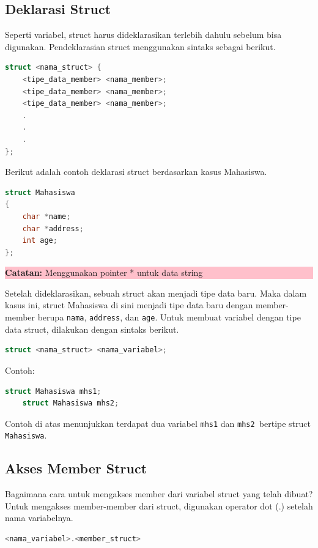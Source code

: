 \subsection{Deklarasi Struct}
Seperti variabel, struct harus dideklarasikan terlebih dahulu sebelum bisa digunakan. Pendeklarasian struct menggunakan sintaks sebagai berikut.

\begin{lstlisting}[language=c]
struct <nama_struct> {
    <tipe_data_member> <nama_member>;
    <tipe_data_member> <nama_member>;
    <tipe_data_member> <nama_member>;
    .
    .
    .
};
\end{lstlisting}

Berikut adalah contoh deklarasi struct berdasarkan kasus Mahasiswa.
\begin{lstlisting}[language=c]
struct Mahasiswa
{
    char *name;
    char *address;
    int age;
};
\end{lstlisting}
\begin{center}
    \colorbox{pink}{\parbox{0.8\linewidth}{\textbf{Catatan:}  Menggunakan pointer * untuk data string}}
\end{center}

Setelah dideklarasikan, sebuah struct akan menjadi tipe data baru.
Maka dalam kasus ini, struct Mahasiswa di sini menjadi tipe data baru dengan member-member berupa \verb|nama|, \verb|address|, dan \verb|age|.
Untuk membuat variabel dengan tipe data struct, dilakukan dengan sintaks berikut.

\begin{lstlisting}[language=c]
    struct <nama_struct> <nama_variabel>;
\end{lstlisting}

Contoh:
\begin{lstlisting}[language=c]
    struct Mahasiswa mhs1;
    struct Mahasiswa mhs2;
\end{lstlisting}
Contoh di atas menunjukkan terdapat dua variabel \verb|mhs1| dan \verb|mhs2 |bertipe struct \verb|Mahasiswa|.

\subsection{Akses Member Struct}
Bagaimana cara untuk mengakses member dari variabel struct yang telah dibuat? \\
Untuk mengakses member-member dari struct, digunakan operator dot (.) setelah nama variabelnya.
\begin{lstlisting}[language=c]
    <nama_variabel>.<member_struct>
\end{lstlisting}

